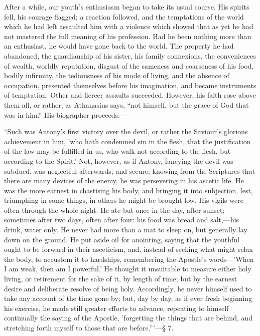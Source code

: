 After a while, our youth's enthusiasm began to take its usual
course. His spirits fell, his courage flagged; a reaction followed,
and the temptations of the world which he had left assaulted him with
a violence which showed that as yet he had not mastered the full
meaning of his profession. Had he been nothing more than an
enthusiast, he would have gone back to the world. The property he had
abandoned, the guardianship of his sister, his family connexions, the
conveniences of wealth, worldly reputation, disgust of the sameness
and coarseness of his food, bodily infirmity, the tediousness of his
mode of living, and the absence of occupation, presented themselves
before his imagination, and became instruments of temptation. Other
and fiercer assaults succeeded. However, his faith rose above them
all, or rather, as Athanasius says, ``not himself, but the grace
of God that was in him.'' His biographer proceeds:—

``Such was Antony's first victory over the devil, or rather the
Saviour's glorious achievement in him, 'who hath condemned sin in the
flesh, that the justification of the law may be fulfilled in us, who
walk not according to the flesh, but according to the Spirit.' Not,
however, as if Antony, fancying the devil was subdued, was neglectful
afterwards, and secure; knowing from the Scriptures that there are
many devices of the enemy, he was persevering in his ascetic life. He
was the more earnest in chastising his body, and bringing it into
subjection, lest, triumphing in some things, in others he might be
brought low. His vigils were often through the whole night. He ate but
once in the day, after sunset; sometimes after two days, often after
four: his food was bread and salt,—his drink, water only. He never
had more than a mat to sleep on, but generally lay down on the ground.
He put aside oil for anointing, saying that the youthful ought to be
forward in their asceticism, and, instead of seeking what might relax
the body, to accustom it to hardships, remembering the Apostle's words—'When
I am weak, then am I powerful.' He thought
it unsuitable to measure either holy living, or retirement for the
sake of it, by length of time; but by the earnest desire and
deliberate resolve of being holy. Accordingly, he never himself used
to take any account of the time gone by; but, day by day, as if ever
fresh beginning his exercise, he made still greater efforts to
advance, repeating to himself continually the saying of the Apostle,
'forgetting the things that are behind, and stretching forth myself to
those that are before.'''—§ 7.

